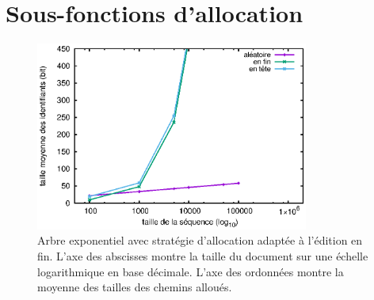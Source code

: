 

\section{Sous-fonctions d'allocation}
\label{repl:sec:suballocation}


\begin{figure}
  \centering
  \includegraphics[width=0.8\textwidth]{img/lseq/robin.eps}
  \caption{\label{repl:img:exponentialtree} Arbre exponentiel avec stratégie
    d'allocation adaptée à l'édition en fin. L'axe des abscisses montre la
    taille du document sur une échelle logarithmique en base décimale. L'axe des
    ordonnées montre la moyenne des tailles des chemins alloués.}
\end{figure}
